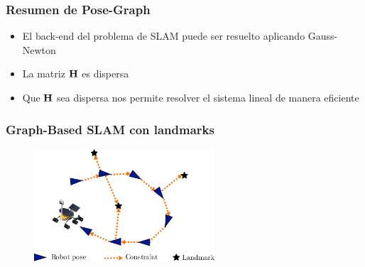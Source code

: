 \begin{frame}
    \frametitle{Resumen de Pose-Graph}
    
    \begin{itemize}
        \item El back-end del problema de SLAM puede ser resuelto aplicando Gauss-Newton
        \item La matriz $\boldsymbol{\mathbf{H}}$ es dispersa
        \item Que $\boldsymbol{\mathbf{H}}$ sea dispersa nos permite resolver el sistema lineal de manera eficiente
    \end{itemize}
    
\end{frame}

\begin{frame}
    \frametitle{Graph-Based SLAM con landmarks}
    
       \begin{figure}[!h]
        \includegraphics[width=0.6\textwidth]{images/pose_landmark_graph_example.pdf}
    \end{figure}
    
\end{frame}

